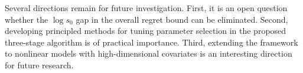 \documentclass[aos,preprint]{imsart}
\theoremstyle{plain}
\theoremstyle{definition}
\begin{document}
 
Several directions remain for future investigation. First, it is an open question whether the $\log s_0$ gap in the overall regret bound can be eliminated. Second, developing principled methods for tuning parameter selection in the proposed three-stage algorithm is of practical importance. Third, extending the framework to nonlinear models with high-dimensional covariates is an interesting direction for future research.








\newpage
\end{document}
